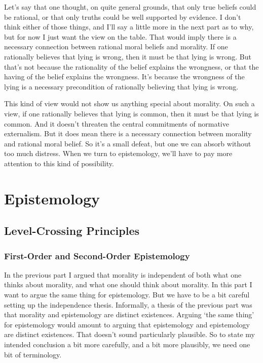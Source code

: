 \documentclass[
  10pt,
  letterpaper,
  twoside]{scrbook}
\begin{document}
Let's say that one thought, on quite general grounds, that only true
beliefs could be rational, or that only truths could be well supported
by evidence. I don't think either of those things, and I'll say a little
more in the next part as to why, but for now I just want the view on the
table. That would imply there is a necessary connection between rational
moral beliefs and morality. If one rationally believes that lying is
wrong, then it must be that lying is wrong. But that's not because the
rationality of the belief explains the wrongness, or that the having of
the belief explains the wrongness. It's because the wrongness of the
lying is a necessary precondition of rationally believing that lying is
wrong.

This kind of view would not show us anything special about morality. On
such a view, if one rationally believes that lying is common, then it
must be that lying is common. And it doesn't threaten the central
commitments of normative externalism. But it does mean there is a
necessary connection between morality and rational moral belief. So it's
a small defeat, but one we can absorb without too much distress. When we
turn to epistemology, we'll have to pay more attention to this kind of
possibility.

\part{Epistemology}

\chapter{Level-Crossing Principles}\label{level-crossingprinciples}

\section{First-Order and Second-Order
Epistemology}\label{first-orderandsecond-orderepistemology}

In the previous part I argued that morality is independent of both what
one thinks about morality, and what one should think about morality. In
this part I want to argue the same thing for epistemology. But we have
to be a bit careful setting up the independence thesis. Informally, a
thesis of the previous part was that morality and epistemology are
distinct existences. Arguing `the same thing' for epistemology would
amount to arguing that epistemology and epistemology are distinct
existences. That doesn't sound particularly plausible. So to state my
intended conclusion a bit more carefully, and a bit more plausibly, we
need one bit of terminology.
\end{document}
